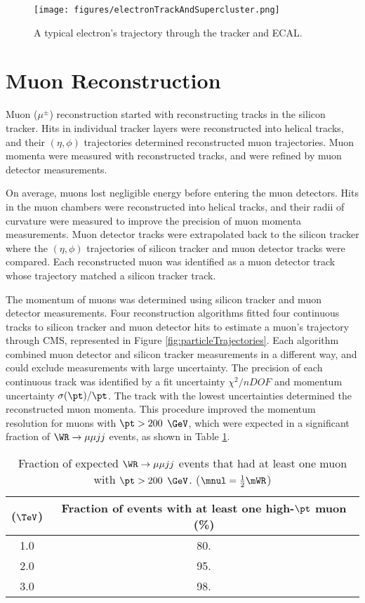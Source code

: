\begin{figure}[h]
	\centering
	\texttt{[image: figures/electronTrackAndSupercluster.png]}
	\caption{A typical electron's trajectory through the tracker and ECAL.}
	\label{fig:eleTrackAndSC}
\end{figure}


\section{Muon Reconstruction}
\label{sec:muReco}
Muon ($\mu^{\pm}$) reconstruction started with reconstructing tracks in the silicon tracker.  
Hits in individual tracker layers were reconstructed into helical tracks, and their $(\eta, \phi)$ 
trajectories determined reconstructed muon trajectories.  Muon momenta were measured with 
reconstructed tracks, and were refined by muon detector measurements.

On average, muons lost negligible energy before entering the muon detectors.  Hits in 
the muon chambers were reconstructed into helical tracks, and their radii of curvature were 
measured to improve the precision of muon momenta measurements.  Muon detector tracks were 
extrapolated back to the silicon tracker where the $(\eta, \phi)$ trajectories of silicon tracker 
and muon detector tracks were compared.  Each reconstructed muon was identified as a muon detector 
track whose trajectory matched a silicon tracker track.

The momentum of muons was determined using silicon tracker and muon detector measurements.  Four 
reconstruction algorithms fitted four continuous tracks \cite{cmsMuonRecoRunTwo} to silicon tracker 
and muon detector hits to estimate a muon's trajectory through CMS, represented in Figure 
\ref{fig:particleTrajectories}.  Each algorithm combined muon detector and silicon tracker measurements 
in a different way, and could exclude measurements with large uncertainty.  The precision of each 
continuous track was identified by a fit uncertainty $\chi^{2}/nDOF$ and momentum uncertainty 
$\sigma(\pt)/\pt$.  The track with the lowest uncertainties determined the reconstructed muon momenta.  
This procedure improved the momentum resolution for muons with $\pt > 200$ $\GeV$, which were 
expected in a significant fraction of $\WR \rightarrow \mu\mu jj$ events, as shown in Table 
\ref{tab:wrHighPtMuons}.

\begin{table}[h]
	\caption{Fraction of expected $\WR \rightarrow \mu\mu jj$ events that had at least one muon with $\pt > 200$ $\GeV$. 
	($\mnul = \frac{1}{2}\mWR$)}
	\label{tab:wrHighPtMuons}
	\centering
	\begin{tabular}{c|c}
		\mWR ($\TeV$) & Fraction of events with at least one high-$\pt$ muon (\%) \\  \hline
		1.0 &  80.  \\
		2.0 &  95.  \\ 
		3.0 &  98.  \\ \hline
	\end{tabular}
\end{table}


